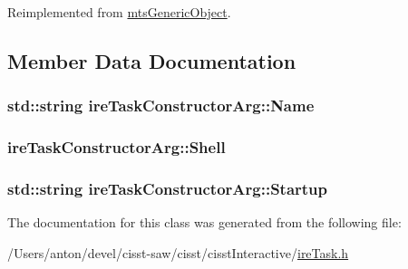 Reimplemented from \hyperlink{classmts_generic_object_a4916a6c62ee5b167d7c93c88ab72523a}{mts\+Generic\+Object}.



\subsection{Member Data Documentation}
\hypertarget{classire_task_constructor_arg_acdf26b246ab025d372e37d4dd177dc22}{}
\subsubsection[{Name}]{\setlength{\rightskip}{0pt plus 5cm}std\+::string ire\+Task\+Constructor\+Arg\+::\+Name}\label{classire_task_constructor_arg_acdf26b246ab025d372e37d4dd177dc22}
\hypertarget{classire_task_constructor_arg_a5235380c8daceb769828415ebdec263e}{}
\subsubsection[{Shell}]{ ire\+Task\+Constructor\+Arg\+::\+Shell}\label{classire_task_constructor_arg_a5235380c8daceb769828415ebdec263e}
\hypertarget{classire_task_constructor_arg_ac3551e515c358cec7e4c193d120dbd3f}{}
\subsubsection[{Startup}]{\setlength{\rightskip}{0pt plus 5cm}std\+::string ire\+Task\+Constructor\+Arg\+::\+Startup}\label{classire_task_constructor_arg_ac3551e515c358cec7e4c193d120dbd3f}


The documentation for this class was generated from the following file\+:\begin{DoxyCompactItemize}
\item 
/\+Users/anton/devel/cisst-\/saw/cisst/cisst\+Interactive/\hyperlink{ire_task_8h}{ire\+Task.\+h}\end{DoxyCompactItemize}
